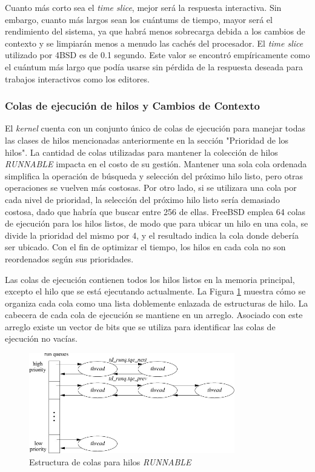 Cuanto más corto sea el \textit{time slice}, mejor será la respuesta interactiva. Sin embargo, cuanto más largos sean los cuántums de tiempo, mayor será el rendimiento del sistema, ya que habrá menos sobrecarga debida a los cambios de contexto y se limpiarán menos a menudo las cachés del procesador. El \textit{time slice} utilizado por 4BSD es de 0.1 segundo. Este valor se encontró empíricamente como el cuántum más largo que podía usarse sin pérdida de la respuesta deseada para trabajos interactivos como los editores.\par

\subsubsection{Colas de ejecución de hilos y Cambios de Contexto}

El \textit{kernel} cuenta con un conjunto único de colas de ejecución para manejar todas las clases de hilos mencionadas anteriormente en la sección "Prioridad de los hilos". La cantidad de colas utilizadas para mantener la colección de hilos \textit{RUNNABLE} impacta en el costo de su gestión. Mantener una sola cola ordenada simplifica la operación de búsqueda y selección del próximo hilo listo, pero otras operaciones se vuelven más costosas. Por otro lado, si se utilizara una cola por cada nivel de prioridad, la selección del próximo hilo listo sería demasiado costosa, dado que habría que buscar entre 256 de ellas. FreeBSD emplea 64 colas de ejecución para los hilos listos, de modo que para ubicar un hilo en una cola, se divide la prioridad del mismo por 4, y el resultado indica la cola donde debería ser ubicado. Con el fin de optimizar el tiempo, los hilos en cada cola no son reordenados según sus prioridades.\par

Las colas de ejecución contienen todos los hilos listos en la memoria principal, excepto el hilo que se está ejecutando actualmente. La Figura \ref{fig:queueing-structure} muestra cómo se organiza cada cola como una lista doblemente enlazada de estructuras de hilo. La cabecera de cada cola de ejecución se mantiene en un arreglo. Asociado con este arreglo existe un vector de bits que se utiliza para identificar las colas de ejecución no vacías.\par

\begin{figure}[H]
    \centering
    \vspace*{0.2in}
    \includegraphics[width=0.8\textwidth]{./images/queueing-structure.jpg}
    \caption{Estructura de colas para hilos \textit{RUNNABLE}}
    \label{fig:queueing-structure}
\end{figure}

